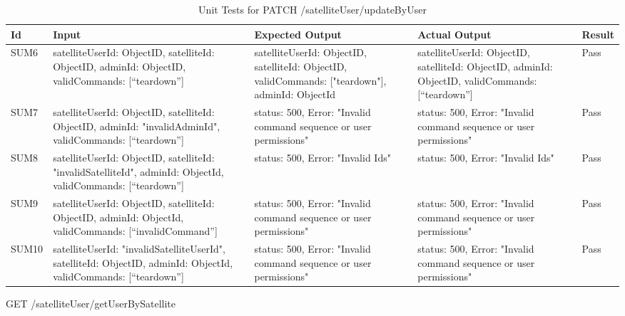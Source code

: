\documentclass[12pt, titlepage]{article}
\begin{document}
\begin{center}
\begin{longtable}{|p{2cm} | p{3cm} |p{2cm}| p{2cm} |p{2cm}|}
\caption{Unit Tests for \newline PATCH /satelliteUser/updateByUser}
\hline
\textbf{Id}  & \textbf{Input} & \textbf{Expected Output} & \textbf{Actual Output} & \textbf{Result} \\
\hline
SUM6 &  { satelliteUserId: ObjectID,
satelliteId: ObjectID,
adminId: ObjectID,
validCommands: [“teardown”] } & { satelliteUserId: ObjectID,
satelliteId: ObjectID,
validCommands: ["teardown"],
adminId: ObjectId } & { satelliteUserId: ObjectID,
satelliteId: ObjectID,
adminId: ObjectID,
validCommands: [“teardown”] } & Pass
\\
\hline
SUM7 &  { satelliteUserId: ObjectID,
satelliteId: ObjectID,
adminId: "invalidAdminId",
validCommands: [“teardown”] }
 & { status: 500,
Error: "Invalid command sequence or user permissions" }
 & { status: 500,
Error: "Invalid command sequence or user permissions" }
 & Pass
\\
\hline
SUM8 &   { satelliteUserId: ObjectID,
satelliteId: "invalidSatelliteId",
adminId: ObjectId,
validCommands: [“teardown”] }
 & { status: 500,
Error: "Invalid Ids" }
 & { status: 500,
Error: "Invalid Ids" }
 & Pass
\\
\hline
SUM9 &   { satelliteUserId: ObjectID,
satelliteId: ObjectID,
adminId: ObjectId,
validCommands: [“invalidCommand”] }
 & { status: 500,
Error: "Invalid command sequence or user permissions" }
 & { status: 500,
Error: "Invalid command sequence or user permissions" }
 & Pass
\\
\hline
SUM10 &   { satelliteUserId: "invalidSatelliteUserId",
satelliteId: ObjectID,
adminId: ObjectId,
validCommands: [“teardown”] }
 & { status: 500,
Error: "Invalid command sequence or user permissions" }
 & { status: 500,
Error: "Invalid command sequence or user permissions" }
 & Pass
\\
\hline

\end{longtable}

\end{center}


GET /satelliteUser/getUserBySatellite
\end{document}
